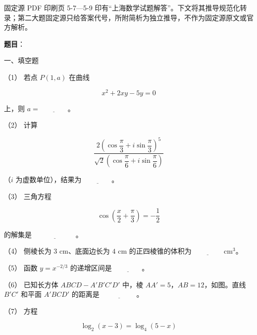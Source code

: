 

\begin{gktip}
固定源 PDF 印刷页 5-7—5-9 印有“上海数学试题解答”。下文将其推导规范化转录；第二大题固定源只给答案代号，所附简析为独立推导，不作为固定源原文或官方解析。
\end{gktip}

\begin{answer}

\textbf{题目}：

一、填空题

（1） 若点 $P(1,a)$ 在曲线

\nopagebreak[4]
\[
x^2+2xy-5y=0
\]

上，则 $a=\underline{\hspace{4em}}$。

（2） 计算

\nopagebreak[4]
\[
\frac{2\left(\cos\dfrac\pi3+i\sin\dfrac\pi3\right)^5}
{\sqrt2\left(\cos\dfrac\pi6+i\sin\dfrac\pi6\right)}
\]

（$i$ 为虚数单位），结果为 $\underline{\hspace{4em}}$。

（3） 三角方程

\nopagebreak[4]
\[
\cos\left(\frac{x}{2}+\frac\pi3\right)=-\frac12
\]

的解集是 $\underline{\hspace{6em}}$。

（4） 侧棱长为 $3\text{ cm}$、底面边长为 $4\text{ cm}$ 的正四棱锥的体积为 $\underline{\hspace{4em}}\text{ cm}^3$。

（5） 函数 $y=x^{-2/3}$ 的递增区间是 $\underline{\hspace{4em}}$。

（6） 已知长方体 $ABCD-A'B'C'D'$ 中，棱 $AA'=5$，$AB=12$，如图。直线 $B'C'$ 和平面 $A'BCD'$ 的距离是 $\underline{\hspace{5em}}$。
\nopagebreak[4]
\begin{center}\end{center}
\nopagebreak[4]
（7） 方程

\nopagebreak[4]
\[
\log_2(x-3)=\log_4(5-x)
\]


\end{answer}
